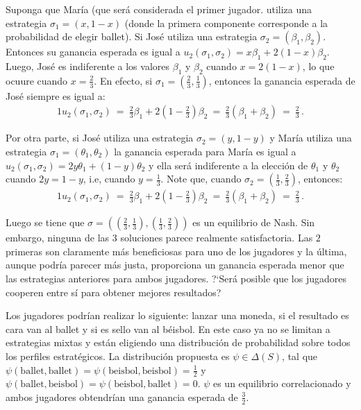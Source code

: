 Suponga que María (que será considerada el primer jugador. utiliza una estrategia $\sigma_1 = (x, 1-x)$ (donde la primera componente corresponde a la probabilidad de elegir ballet). Si José utiliza una estrategia $\sigma_2 = (\beta_1, \beta_2)$. Entonces su ganancia esperada es igual a $u_2(\sigma_1, \sigma_2) = x\beta_1 + 2(1-x)\beta_2$. Luego, José es indiferente a los valores $\beta_1$ y $\beta_2$ cuando $x = 2(1-x)$, lo que ocuure cuando $x = \frac{2}{3}$. En efecto, si $\sigma_1 = \left(\frac{2}{3}, \frac{1}{3} \right)$, entonces la ganancia esperada de José siempre es igual a:
\begin{alignat}{1}
u_2(\sigma_1, \sigma_2)\ =\ \frac{2}{3}\beta_1 + 2\left(1-\frac{2}{3} \right)\beta_2\ =\ \frac{2}{3}(\beta_1 + \beta_2)\ =\ \frac{2}{3} \,.
\end{alignat}

Por otra parte, si José utiliza una estrategia $\sigma_2 = (y, 1-y)$ y María utiliza una estrategia $\sigma_1 = (\theta_1, \theta_2)$ la ganancia esperada para María es igual a $u_2(\sigma_1, \sigma_2) = 2y\theta_1 + (1-y)\theta_2$ y ella será indiferente a la elección de $\theta_1$ y $\theta_2$ cuando $2y = 1-y$, i.e, cuando $y = \frac{1}{3}$. Note que, cuando $\sigma_2 = \left(\frac{1}{3}, \frac{2}{3} \right)$, entonces:
\begin{alignat}{1}
u_2(\sigma_1, \sigma_2)\ =\ \frac{2}{3}\beta_1 + 2\left(1-\frac{2}{3} \right)\beta_2\ =\ \frac{2}{3}(\beta_1 + \beta_2)\ =\ \frac{2}{3} \,.
\end{alignat}

Luego se tiene que $\sigma = \left(\left(\frac{2}{3}, \frac{1}{3}\right), \left(\frac{1}{3}, \frac{2}{3}\right)\right)$ es un equilibrio de Nash. Sin embargo, ninguna de las $3$ soluciones parece realmente satisfactoria. Las $2$ primeras son claramente más beneficiosas para uno de los jugadores y la última, aunque podría parecer más justa, proporciona un ganancia esperada menor que las estrategias anteriores para ambos jugadores. ?`Será posible que los jugadores cooperen entre sí para obtener mejores resultados?

Los jugadores podrían realizar lo siguiente: lanzar una moneda, si el resultado es cara van al ballet y si es sello van al béisbol. En este caso ya no se limitan a estrategias mixtas y están eligiendo una distribución de probabilidad sobre todos los perfiles estratégicos. La distribución propuesta es $\psi \in \Delta(S)$, tal que $\psi(\text{ballet}, \text{ballet}) = \psi(\text{beisbol}, \text{beisbol}) = \frac{1}{2}$ y $\psi(\text{ballet}, \text{beisbol}) = \psi(\text{beisbol}, \text{ballet}) =0$. $\psi$ es un equilibrio correlacionado y ambos jugadores obtendrían una ganancia esperada de $\frac{3}{2}$.